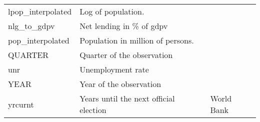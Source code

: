 \documentclass[11pt]{article}
\begin{document}
\begin{landscape}
\begin{longtable}{lll}
lpop\_interpolated & Log of population. & \\
nlg\_to\_gdpv & Net lending in \% of gdpv & \\
pop\_interpolated & Population in million of persons. & \\
QUARTER & Quarter of the observation & \\
unr & Unemployment rate & \\
YEAR & Year of the observation & \\
yrcurnt & Years until the next official election & World Bank\\
\hline
\end{longtable}


\end{landscape}
\end{document}
